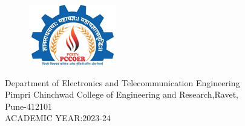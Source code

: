 \documentclass[12pt,a4paper]{report}
\begin{document}
\begin{titlepage}
\begin{center}
\begin{figure}[!htb]
\begin{center}
\includegraphics[scale=1.0]{images/logo/pccoelogo.png}
\end{center}
\end{figure}

\large{Department of Electronics and Telecommunication
Engineering}\\

\Large{Pimpri Chinchwad College of Engineering and Research,Ravet,\\
Pune-412101\\

ACADEMIC YEAR:2023-24}
\end{center}

\end{titlepage}


\end{document}
